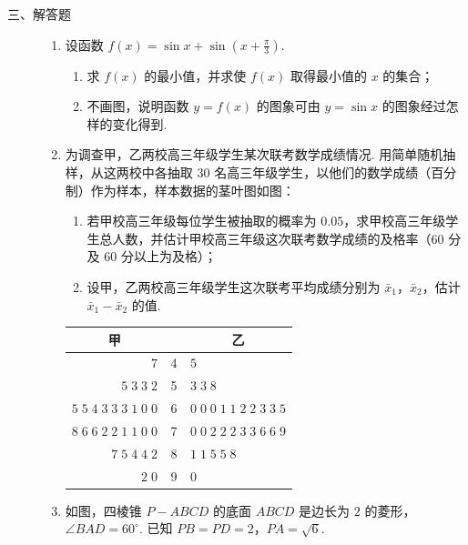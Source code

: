\begin{description}

    \item[三、解答题]

    \begin{enumerate}[leftmargin=5pt]

      \addtocounter{enumi}{+15}

        \item 设函数 \( f(x) = \sin x + \sin \left(x + \frac{\pi}{3}\right) \).
\begin{enumerate}
\item 求 \( f(x) \) 的最小值，并求使 \( f(x) \) 取得最小值的 \(x\) 的集合；
\item 不画图，说明函数 \( y = f(x) \) 的图象可由 \( y = \sin x \) 的图象经过怎样的变化得到.
\end{enumerate}

        \item 为调查甲，乙两校高三年级学生某次联考数学成绩情况. 用简单随机抽样，从这两校中各抽取 \(30\) 名高三年级学生，以他们的数学成绩（百分制）作为样本，样本数据的茎叶图如图：

\begin{enumerate}
\item 若甲校高三年级每位学生被抽取的概率为 \(0.05\)，求甲校高三年级学生总人数，并估计甲校高三年级这次联考数学成绩的及格率（\(60\) 分及 \(60\) 分以上为及格）；
\item 设甲，乙两校高三年级学生这次联考平均成绩分别为 \(\bar{x}_{1}\)，\(\bar{x}_{2}\)，估计 \( \bar{x}_{1} - \bar{x}_{2} \) 的值.
\end{enumerate}

\begin{center}
\begin{tabular}{r|c|l}
\multicolumn{1}{c}{甲} & \  & \multicolumn{1}{c}{乙} \\
\hline
\(7\) & 4 & \(5\) \\
\(5\;3\;3\;2\) & 5 & \(3\;3\;8\) \\
\(5\;5\;4\;3\;3\;3\;1\;0\;0\) & 6 & \(0\;0\;0\;1\;1\;2\;2\;3\;3\;5\) \\
\(8\;6\;6\;2\;2\;1\;1\;0\;0\) & 7 & \(0\;0\;2\;2\;2\;3\;3\;6\;6\;9\) \\
\(7\;5\;4\;4\;2\) & 8 & \(1\;1\;5\;5\;8\) \\
\(2\;0\) & 9 & \(0\)
\end{tabular}
\end{center}

        \item 如图，四棱锥 \(P - ABCD\) 的底面 \(ABCD\) 是边长为 \(2\) 的菱形，\(\angle BAD = 60^{\circ}\). 已知 \(PB = PD = 2\)，\(PA = \sqrt{6}\).


\end{enumerate}
\end{description}
